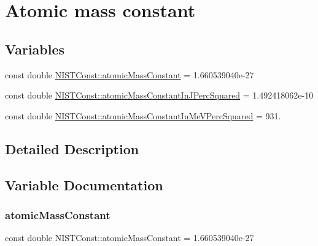\hypertarget{group___n_i_s_t_const-_atomic_mass_constant}{}\section{Atomic mass constant}
\label{group___n_i_s_t_const-_atomic_mass_constant}
\subsection*{Variables}
\begin{DoxyCompactItemize}
\item 
const double \hyperlink{group___n_i_s_t_const-_atomic_mass_constant_ga2c815ce73f942601621223bef09be40a}{N\+I\+S\+T\+Const\+::atomic\+Mass\+Constant} = 1.\+660539040e-\/27
\item 
const double \hyperlink{group___n_i_s_t_const-_atomic_mass_constant_ga59e3df8073f8ba5570bc3c9308655215}{N\+I\+S\+T\+Const\+::atomic\+Mass\+Constant\+In\+J\+Perc\+Squared} = 1.\+492418062e-\/10
\item 
const double \hyperlink{group___n_i_s_t_const-_atomic_mass_constant_ga8bf06e408e84fc35515a4d6564407467}{N\+I\+S\+T\+Const\+::atomic\+Mass\+Constant\+In\+Me\+V\+Perc\+Squared} = 931.
\end{DoxyCompactItemize}


\subsection{Detailed Description}


\subsection{Variable Documentation}
\mbox{\label{group___n_i_s_t_const-_atomic_mass_constant_ga2c815ce73f942601621223bef09be40a}} 
\subsubsection{\texorpdfstring{atomic\+Mass\+Constant}{atomicMassConstant}}
{\footnotesize\ttfamily const double N\+I\+S\+T\+Const\+::atomic\+Mass\+Constant = 1.\+660539040e-\/27}

